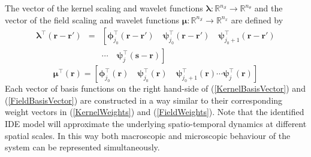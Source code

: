 \documentclass[journal,a4paper]{IEEEtran}
\begin{document}
 The vector of the kernel scaling and wavelet functions $\boldsymbol\lambda: \mathbb{R}^{n_{\mathcal S}}\rightarrow \mathbb{R}^{n_{\theta}}$ and the vector of the field scaling and wavelet functions $\boldsymbol\mu: \mathbb{R}^{n_{\mathcal S}}\rightarrow \mathbb{R}^{n_x}$ are defined by
\begin{eqnarray}
 \boldsymbol\lambda^\top(\mathbf r-\mathbf r')&=&\left[ \boldsymbol\phi_{j_0}^\top(\mathbf r-\mathbf r') \quad \boldsymbol\psi_{j_0}^\top(\mathbf r-\mathbf r') \quad \boldsymbol\psi_{j_0+1}^\top(\mathbf r-\mathbf r') \right. \nonumber \\
&&\left. \cdots \quad \boldsymbol\psi_{j}^\top(\mathbf s-\mathbf r)\right]
\label{KernelBasisVector} 
\end{eqnarray}
\begin{equation}
 \boldsymbol\mu^\top(\mathbf r)=\left[ \boldsymbol\phi_{j_0}^\top(\mathbf r) \quad \boldsymbol\psi_{j_0}^\top(\mathbf r) \quad \boldsymbol\psi_{j_0+1}^\top(\mathbf r) \cdots \boldsymbol\psi_{j}^\top(\mathbf r) \right] 
\label{FieldBasisVector}
\end{equation}
Each vector of basis functions on the right hand-side of (\ref{KernelBasisVector}) and (\ref{FieldBasisVector}) are constructed in a way similar to their corresponding weight vectors in (\ref{KernelWeights}) and (\ref{FieldWeights}). Note that the identified IDE model will approximate the underlying spatio-temporal dynamics at different spatial scales. In this way both macroscopic and microscopic behaviour of the system can be represented simultaneously. 
\end{document}
